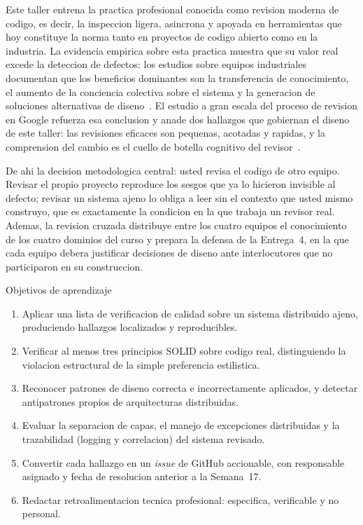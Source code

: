 \documentclass[11pt,a4paper]{article}
\begin{document}
Este taller entrena la practica profesional conocida como revision moderna de codigo, es decir, la inspeccion ligera, asincrona y apoyada en herramientas que hoy constituye la norma tanto en proyectos de codigo abierto como en la industria.
La evidencia empirica sobre esta practica muestra que su valor real excede la deteccion de defectos: los estudios sobre equipos industriales documentan que los beneficios dominantes son la transferencia de conocimiento, el aumento de la conciencia colectiva sobre el sistema y la generacion de soluciones alternativas de diseno~\cite{BacchelliBird2013CodeReview}.
El estudio a gran escala del proceso de revision en Google refuerza esa conclusion y anade dos hallazgos que gobiernan el diseno de este taller: las revisiones eficaces son pequenas, acotadas y rapidas, y la comprension del cambio es el cuello de botella cognitivo del revisor~\cite{Sadowski2018ModernCodeReview}.

De ahi la decision metodologica central: usted revisa el codigo de otro equipo.
Revisar el propio proyecto reproduce los sesgos que ya lo hicieron invisible al defecto; revisar un sistema ajeno lo obliga a leer sin el contexto que usted mismo construyo, que es exactamente la condicion en la que trabaja un revisor real.
Ademas, la revision cruzada distribuye entre los cuatro equipos el conocimiento de los cuatro dominios del curso y prepara la defensa de la Entrega~4, en la que cada equipo debera justificar decisiones de diseno ante interlocutores que no participaron en su construccion.

\begin{uteqbox}{Objetivos de aprendizaje}
    \begin{enumerate}
        \item Aplicar una lista de verificacion de calidad sobre un sistema distribuido ajeno, produciendo hallazgos localizados y reproducibles.
        \item Verificar al menos tres principios SOLID sobre codigo real, distinguiendo la violacion estructural de la simple preferencia estilistica.
        \item Reconocer patrones de diseno correcta e incorrectamente aplicados, y detectar antipatrones propios de arquitecturas distribuidas.
        \item Evaluar la separacion de capas, el manejo de excepciones distribuidas y la trazabilidad (logging y correlacion) del sistema revisado.
        \item Convertir cada hallazgo en un \emph{issue} de GitHub accionable, con responsable asignado y fecha de resolucion anterior a la Semana~17.
        \item Redactar retroalimentacion tecnica profesional: especifica, verificable y no personal.
    \end{enumerate}
\end{uteqbox}
\end{document}
